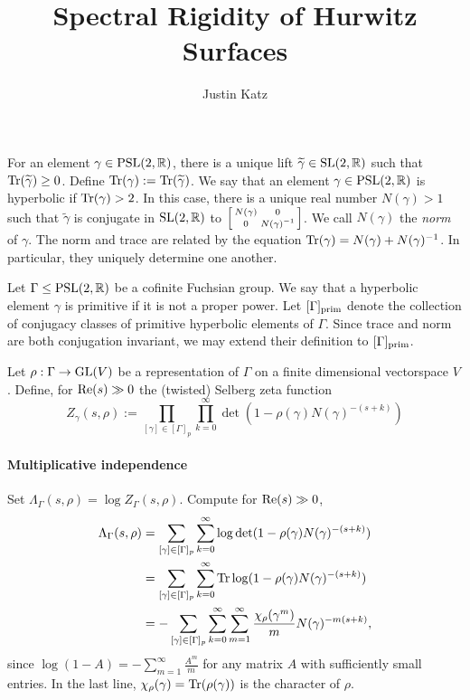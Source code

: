\documentclass[11pt]{amsart}
\title{Spectral Rigidity of Hurwitz Surfaces}
\author{Justin Katz}
\begin{document}
\maketitle 

For an element $\gamma \in \operatorname{PSL}(2,\mathbb{R})$, there is a unique lift $\widetilde{\gamma} \in \operatorname{SL}(2,\mathbb{R})$ such that $\operatorname{Tr}(\widetilde{\gamma})\geq 0$. Define $\operatorname{Tr}(\gamma):= \operatorname{Tr}(\widetilde{\gamma})$. We say that an element $\gamma \in \operatorname{PSL}(2,\mathbb{R})$ is hyperbolic if $\operatorname{Tr}(\gamma)>2$. In this case, there is a unique real number $N(\gamma)>1$ such that $\tilde{\gamma}$ is conjugate in $\operatorname{SL}(2,\mathbb{R})$ to $\left[ \begin{smallmatrix} N(\gamma) & 0 \\ 0 & N(\gamma)^{-1} \end{smallmatrix} \right]$. We call $N(\gamma)$ the \emph{norm} of $\gamma$. The norm and trace are related by the equation $\operatorname{Tr}(\gamma)=N(\gamma)+N(\gamma)^{-1}$. In particular, they uniquely determine one another. 

Let $\Gamma \leq \operatorname{PSL}(2,\mathbb{R})$ be a cofinite Fuchsian group. We say that a hyperbolic element $\gamma$ is primitive if it is not a proper power.  Let $[\Gamma]_{\operatorname{prim}}$ denote the collection of conjugacy classes of primitive hyperbolic elements of $\Gamma$. Since trace and norm are both conjugation invariant, we may extend their definition to $[\Gamma]_{\operatorname{prim}}$.

Let $\rho:\Gamma\to \operatorname{GL}(V)$ be a representation of $\Gamma$ on a finite dimensional vectorspace $V$. Define, for $\operatorname{Re}(s)\gg 0$ the (twisted) Selberg zeta function
	\[ Z_{\gamma}(s,\rho):= \prod_{[\gamma]\in [\Gamma]_{p}}\prod_{k=0}^{\infty}\det(1-\rho(\gamma)N(\gamma)^{-(s+k)}) \]

\paragraph{Multiplicative independence}
  

Set $\Lambda_\Gamma(s,\rho)=\log Z_\Gamma(s,\rho)$. Compute for $\operatorname{Re}(s)\gg 0$,
\begin{align*}
\Lambda_\Gamma(s,\rho)&=\sum_{[\gamma]\in [\Gamma]_p} \sum_{k=0}^\infty \log \det (1-\rho(\gamma)N(\gamma)^{-(s+k)}) \\
 &=\sum_{[\gamma]\in [\Gamma]_p} \sum_{k=0}^\infty \operatorname{Tr} \log (1-\rho(\gamma)N(\gamma)^{-(s+k)})  \\
&=-\sum_{[\gamma]\in [\Gamma]_p} \sum_{k=0}^\infty\sum_{m=1}^\infty \frac{\chi_\rho(\gamma^m)}{m}N(\gamma)^{-m(s+k)},
\end{align*}
since $\log(1-A)=-\sum_{m=1}^\infty \frac{A^m}{m}$ for any matrix $A$ with sufficiently small entries. In the last line, $\chi_\rho(\gamma)=\operatorname{Tr}(\rho(\gamma))$ is the character of $\rho$. 
\end{document}
